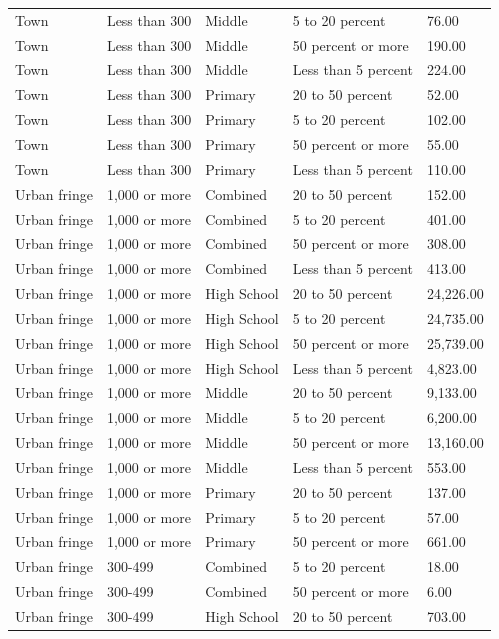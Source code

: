 \documentclass[man]{apa6}
\begin{document}
\begin{table}[tbp]
\begin{center}
\begin{threeparttable}
\begin{tabular}{lllll}
Town & Less than 300 & Middle & 5 to 20 percent & 76.00\\
Town & Less than 300 & Middle & 50 percent or more & 190.00\\
Town & Less than 300 & Middle & Less than 5 percent & 224.00\\
Town & Less than 300 & Primary & 20 to 50 percent & 52.00\\
Town & Less than 300 & Primary & 5 to 20 percent & 102.00\\
Town & Less than 300 & Primary & 50 percent or more & 55.00\\
Town & Less than 300 & Primary & Less than 5 percent & 110.00\\
Urban fringe & 1,000 or more & Combined & 20 to 50 percent & 152.00\\
Urban fringe & 1,000 or more & Combined & 5 to 20 percent & 401.00\\
Urban fringe & 1,000 or more & Combined & 50 percent or more & 308.00\\
Urban fringe & 1,000 or more & Combined & Less than 5 percent & 413.00\\
Urban fringe & 1,000 or more & High School & 20 to 50 percent & 24,226.00\\
Urban fringe & 1,000 or more & High School & 5 to 20 percent & 24,735.00\\
Urban fringe & 1,000 or more & High School & 50 percent or more & 25,739.00\\
Urban fringe & 1,000 or more & High School & Less than 5 percent & 4,823.00\\
Urban fringe & 1,000 or more & Middle & 20 to 50 percent & 9,133.00\\
Urban fringe & 1,000 or more & Middle & 5 to 20 percent & 6,200.00\\
Urban fringe & 1,000 or more & Middle & 50 percent or more & 13,160.00\\
Urban fringe & 1,000 or more & Middle & Less than 5 percent & 553.00\\
Urban fringe & 1,000 or more & Primary & 20 to 50 percent & 137.00\\
Urban fringe & 1,000 or more & Primary & 5 to 20 percent & 57.00\\
Urban fringe & 1,000 or more & Primary & 50 percent or more & 661.00\\
Urban fringe & 300-499 & Combined & 5 to 20 percent & 18.00\\
Urban fringe & 300-499 & Combined & 50 percent or more & 6.00\\
Urban fringe & 300-499 & High School & 20 to 50 percent & 703.00\\

\end{tabular}
\end{threeparttable}
\end{center}
\end{table}
\end{document}
